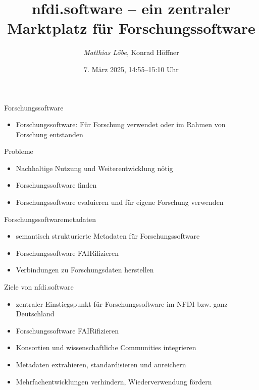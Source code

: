 \documentclass[aspectratio=1610,12pt]{beamer}
\author{\emph{Matthias Löbe}, Konrad Höffner}
\title{\large nfdi.software – ein zentraler Marktplatz für Forschungssoftware}
\date{7. März 2025, 14:55--15:10 Uhr}
\begin{document}
\begin{frame}
\titlepage
\end{frame}

\begin{frame}{Forschungssoftware}
\begin{itemize}
\item Forschungssoftware: Für Forschung verwendet oder im Rahmen von Forschung entstanden
\end{itemize}
\end{frame}

\begin{frame}{Probleme}
\begin{itemize}
\item Nachhaltige Nutzung und Weiterentwicklung nötig
\item Forschungssoftware finden
\item Forschungssoftware evaluieren und für eigene Forschung verwenden
\end{itemize}
\end{frame}

\begin{frame}{Forschungssoftwaremetadaten}
\begin{itemize}
\item semantisch strukturierte Metadaten für Forschungssoftware
\item Forschungssoftware FAIRifizieren
\item Verbindungen zu Forschungsdaten herstellen
\end{itemize}
\end{frame}

\begin{frame}{Ziele von nfdi.software}
\begin{itemize}
\item zentraler Einstiegspunkt für Forschungssoftware im NFDI bzw. ganz Deutschland
\item Forschungssoftware FAIRifizieren
\item Konsortien und wissenschaftliche Communities integrieren
\item Metadaten extrahieren, standardisieren und anreichern
\item Mehrfachentwicklungen verhindern, Wiederverwendung fördern
\end{itemize}
\end{frame}

\end{document}
